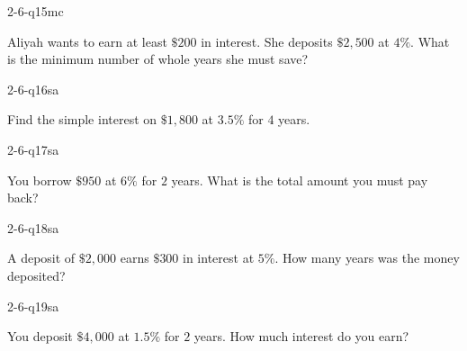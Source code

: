 \begin{practiceQuestion}{2-6-q15}{mc}
\begin{questionText}
Aliyah wants to earn at least $\$200$ in interest. She deposits $\$2{,}500$ at $4\%$. What is the minimum number of whole years she must save?
\end{questionText}
\end{practiceQuestion}


\begin{practiceQuestion}{2-6-q16}{sa}
\begin{questionText}
Find the simple interest on $\$1{,}800$ at $3.5\%$ for $4$ years.
\end{questionText}
\end{practiceQuestion}

\begin{practiceQuestion}{2-6-q17}{sa}
\begin{questionText}
You borrow $\$950$ at $6\%$ for $2$ years. What is the total amount you must pay back?
\end{questionText}
\end{practiceQuestion}

\begin{practiceQuestion}{2-6-q18}{sa}
\begin{questionText}
A deposit of $\$2{,}000$ earns $\$300$ in interest at $5\%$. How many years was the money deposited?
\end{questionText}
\end{practiceQuestion}

\begin{practiceQuestion}{2-6-q19}{sa}
\begin{questionText}
You deposit $\$4{,}000$ at $1.5\%$ for $2$ years. How much interest do you earn?
\end{questionText}
\end{practiceQuestion}

